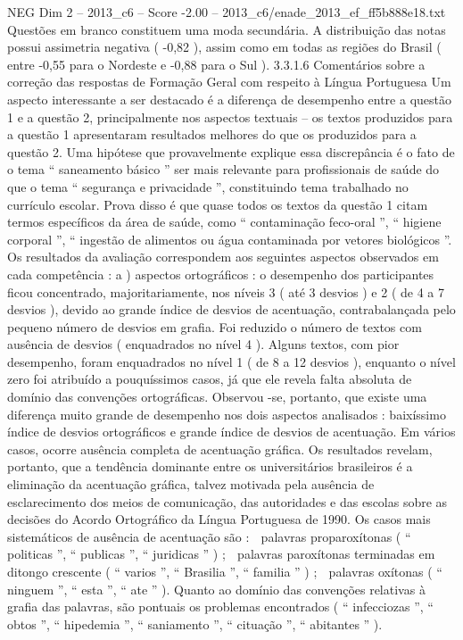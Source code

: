 \begin{textsample}{NEG Dim 2 – 2013\_c6 – Score -2.00 – 2013\_c6/enade\_2013\_ef\_ff5b888e18.txt}
Questões em branco constituem uma moda secundária.
A distribuição das notas possui assimetria negativa ( -0,82 ), assim como em todas as regiões do Brasil ( entre -0,55 para o Nordeste e -0,88 para o Sul ). 3.3.1.6 Comentários sobre a correção das respostas de Formação Geral com respeito à Língua Portuguesa Um aspecto interessante a ser destacado é a diferença de desempenho entre a questão 1 e a questão 2, principalmente nos aspectos textuais – os textos produzidos para a questão 1 apresentaram resultados melhores do que os produzidos para a questão 2.
Uma hipótese que provavelmente explique essa discrepância é o fato de o tema “ saneamento básico ” ser mais relevante para profissionais de saúde do que o tema “ segurança e privacidade ”, constituindo tema trabalhado no currículo escolar.
Prova disso é que quase todos os textos da questão 1 citam termos específicos da área de saúde, como “ contaminação feco-oral ”, “ higiene corporal ”, “ ingestão de alimentos ou água contaminada por vetores biológicos ”.
Os resultados da avaliação correspondem aos seguintes aspectos observados em cada competência : a ) aspectos ortográficos : o desempenho dos participantes ficou concentrado, majoritariamente, nos níveis 3 ( até 3 desvios ) e 2 ( de 4 a 7 desvios ), devido ao grande índice de desvios de acentuação, contrabalançada pelo pequeno número de desvios em grafia.
Foi reduzido o número de textos com ausência de desvios ( enquadrados no nível 4 ).
Alguns textos, com pior desempenho, foram enquadrados no nível 1 ( de 8 a 12 desvios ), enquanto o nível zero foi atribuído a pouquíssimos casos, já que ele revela falta absoluta de domínio das convenções ortográficas.
Observou -se, portanto, que existe uma diferença muito grande de desempenho nos dois aspectos analisados : baixíssimo índice de desvios ortográficos e grande índice de desvios de acentuação.
Em vários casos, ocorre ausência completa de acentuação gráfica.
Os resultados revelam, portanto, que a tendência dominante entre os universitários brasileiros é a eliminação da acentuação gráfica, talvez motivada pela ausência de esclarecimento dos meios de comunicação, das autoridades e das escolas sobre as decisões do Acordo Ortográfico da Língua Portuguesa de 1990.
Os casos mais sistemáticos de ausência de acentuação são :  palavras proparoxítonas ( “ politicas ”, “ publicas ”, “ juridicas ” ) ;  palavras paroxítonas terminadas em ditongo crescente ( “ varios ”, “ Brasilia ”, “ familia ” ) ;  palavras oxítonas ( “ ninguem ”, “ esta ”, “ ate ” ).
Quanto ao domínio das convenções relativas à grafia das palavras, são pontuais os problemas encontrados ( “ infecciozas ”, “ obtos ”, “ hipedemia ”, “ saniamento ”, “ cituação ”, “ abitantes ” ).

\end{textsample}
